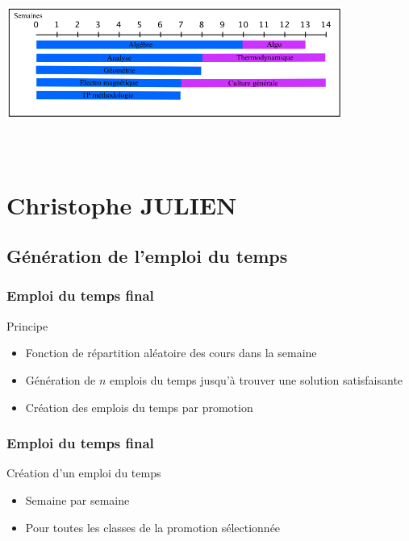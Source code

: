 \documentclass{beamer}
\begin{document}
\begin{frame}
\begin{center}
\includegraphics [width=110mm, height=60mm]{RepartitionSemestre.png}
\end{center}
\end{frame}

\section{Christophe JULIEN}
\subsection{Génération de l'emploi du temps}
\begin{frame}
\frametitle{Emploi du temps final}
\begin{block}{Principe}
\begin{itemize}
\item Fonction de répartition aléatoire des cours dans la semaine\\
\item Génération de $n$ emplois du temps jusqu'à trouver une solution satisfaisante\\ 
\item Création des emplois du temps par promotion
\end{itemize}
\end{block}
\end{frame}

\begin{frame}
\frametitle{Emploi du temps final}
\begin{block}{Création d'un emploi du temps}
\begin{itemize}
\item Semaine par semaine
\item Pour toutes les classes de la promotion sélectionnée
\end{itemize}
\end{block}
\end{frame}
\end{document}
